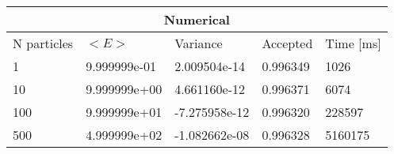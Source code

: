 \begin{tabular}{|l|l|l|l|l|}
\hline 
\multicolumn{5}{|c|}{Numerical}\\ 
\hline 
N particles & $<E>$ & Variance & Accepted & Time [ms]\\ 
 \hline 
1 & 9.999999e-01 & 2.009504e-14 & 0.996349 & 1026 \\ 
\hline10 & 9.999999e+00 & 4.661160e-12 & 0.996371 & 6074 \\ 
\hline100 & 9.999999e+01 & -7.275958e-12 & 0.996320 & 228597 \\ 
\hline500 & 4.999999e+02 & -1.082662e-08 & 0.996328 & 5160175 \\ 
\hline\end{tabular}